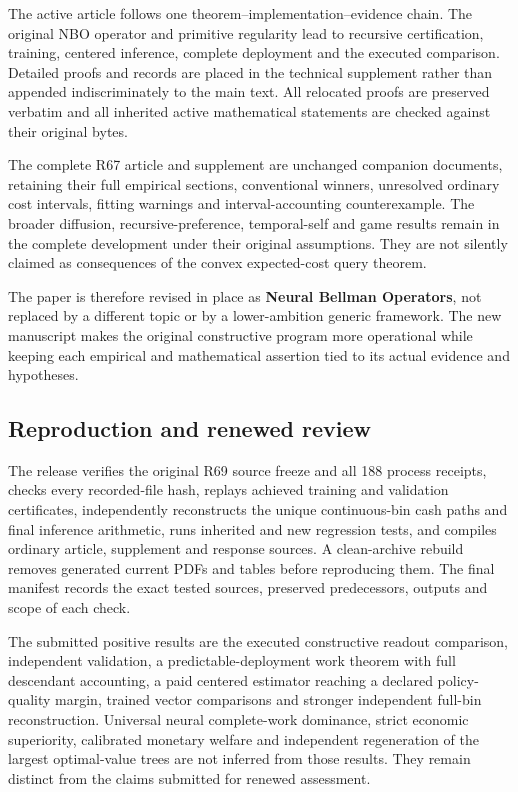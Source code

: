 \documentclass[ecta,nameyear,draft]{econsocart}
\begin{document}
The active article follows one theorem--implementation--evidence chain.
The original NBO operator and primitive regularity lead to recursive
certification, training, centered inference, complete deployment and the
executed comparison. Detailed proofs and records are placed in the
technical supplement rather than appended indiscriminately to the main
text. All relocated proofs are preserved verbatim and all inherited
active mathematical statements are checked against their original bytes.

The complete R67 article and supplement are unchanged companion
documents, retaining their full empirical sections, conventional
winners, unresolved ordinary cost intervals, fitting warnings and
interval-accounting counterexample. The broader diffusion,
recursive-preference, temporal-self and game results remain in the
complete development under their original assumptions. They are not
silently claimed as consequences of the convex expected-cost query
theorem.

The paper is therefore revised in place as \textbf{Neural Bellman
Operators}, not replaced by a different topic or by a lower-ambition
generic framework. The new manuscript makes the original constructive
program more operational while keeping each empirical and mathematical
assertion tied to its actual evidence and hypotheses.

\hypertarget{reproduction-and-renewed-review}{%
\subsection{Reproduction and renewed
review}\label{reproduction-and-renewed-review}}

The release verifies the original R69 source freeze and all 188 process
receipts, checks every recorded-file hash, replays achieved training and
validation certificates, independently reconstructs the unique
continuous-bin cash paths and final inference arithmetic, runs inherited
and new regression tests, and compiles ordinary article, supplement and
response sources. A clean-archive rebuild removes generated current PDFs
and tables before reproducing them. The final manifest records the exact
tested sources, preserved predecessors, outputs and scope of each check.

The submitted positive results are the executed constructive readout
comparison, independent validation, a predictable-deployment work
theorem with full descendant accounting, a paid centered estimator
reaching a declared policy-quality margin, trained vector comparisons
and stronger independent full-bin reconstruction. Universal neural
complete-work dominance, strict economic superiority, calibrated
monetary welfare and independent regeneration of the largest
optimal-value trees are not inferred from those results. They remain
distinct from the claims submitted for renewed assessment.
\end{document}
